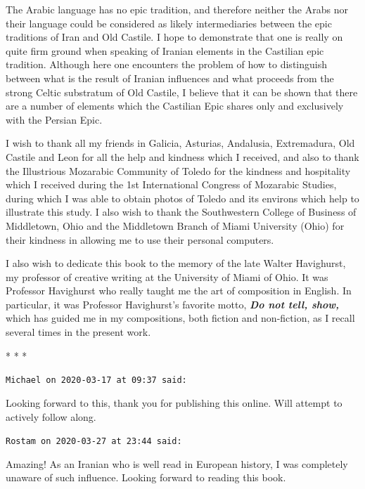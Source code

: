The Arabic language has no epic tradition, and therefore neither the Arabs nor their language could be considered as likely intermediaries between the epic traditions of Iran and Old Castile. I hope to demonstrate that one is really on quite firm ground when speaking of Iranian elements in the Castilian epic tradition. Although here one encounters the problem of how to distinguish between what is the result of Iranian influences and what proceeds from the strong Celtic substratum of Old Castile, I believe that it can be shown that there are a number of elements which the Castilian Epic shares only and exclusively with the Persian Epic.

I wish to thank all my friends in Galicia, Asturias, Andalusia, Extremadura, Old Castile and Leon for all the help and kindness which I received, and also to thank the Illustrious Mozarabic Community of Toledo for the kindness and hospitality which I received during the 1st International Congress of Mozarabic Studies, during which I was able to obtain photos of Toledo and its environs which help to illustrate this study. I also wish to thank the Southwestern College of Business of Middletown, Ohio and the Middletown Branch of Miami University (Ohio) for their kindness in allowing me to use their personal computers.

I also wish to dedicate this book to the memory of the late Walter Havighurst, my professor of creative writing at the University of Miami of Ohio. It was Professor Havighurst who really taught me the art of composition in English. In particular, it was Professor Havighurst's favorite motto, \textbf{\emph{Do not tell, show,}} which has guided me in my compositions, both fiction and non-fiction, as I recall several times in the present work.



\begin{center}* * *\end{center}

\begin{footnotesize}
\begin{sffamily}
\texttt{Michael on 2020-03-17 at 09:37 said:}

Looking forward to this, thank you for publishing this online. Will attempt to actively follow along.

\hfill

\texttt{Rostam on 2020-03-27 at 23:44 said:}

Amazing! As an Iranian who is well read in European history, I was completely unaware of such influence. Looking forward to reading this book.


\hfill

\end{sffamily}
\end{footnotesize}

